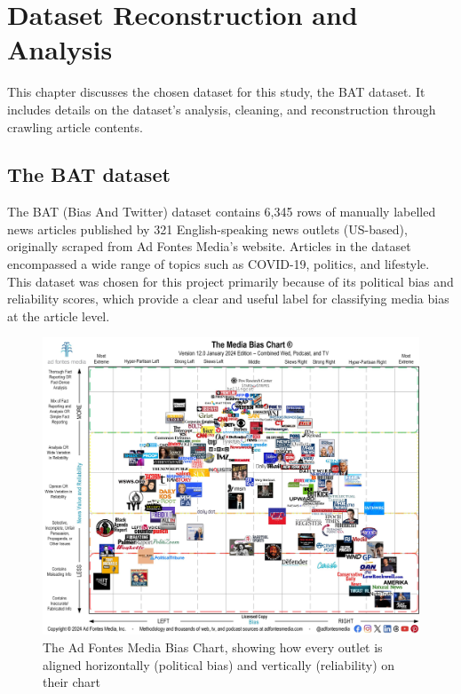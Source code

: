 \chapter{Dataset Reconstruction and Analysis}
\label{cha:3}

This chapter discusses the chosen dataset for this study, the BAT dataset. It includes details on the dataset's analysis, cleaning, and reconstruction through crawling article contents.

\section{The BAT dataset} \label{bat-characteristics}

The BAT (Bias And Twitter) dataset \cite{spinde-2023-bat} contains 6,345 rows of manually labelled news articles published by 321 English-speaking news outlets (US-based), originally scraped from Ad Fontes Media's website. Articles in the dataset encompassed a wide range of topics such as COVID-19, politics, and lifestyle. This dataset was chosen for this project primarily because of its political bias and reliability scores, which provide a clear and useful label for classifying media bias at the article level.


\begin{figure}[htbp]
    \centering
    \includegraphics[width=1\linewidth]{images/Media-Bias-Chart-12.0_Jan-2024-Licensed-scaled.jpg}
    \caption{The Ad Fontes Media Bias Chart, showing how every outlet is aligned horizontally (political bias) and vertically (reliability) on their chart \cite{adfontes-media-bias-chart}}
    \label{fig:adfontes-media-bias-chart}
\end{figure}

